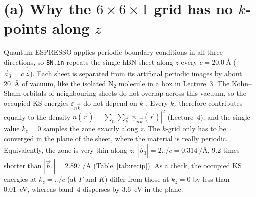 \documentclass[11pt,a4paper]{article}
\newcommand{\vb}[1]{\vec{#1}}
\begin{document}
\section*{(a) Why the $6\times6\times1$ grid has no $k$-points along $z$}
Quantum ESPRESSO applies periodic boundary conditions in all three directions, so \texttt{BN.in} repeats the
single hBN sheet along $z$ every $c=\SI{20.0}{\angstrom}$ ($\vb a_3=c\,\hat{\vb z}$). Each sheet is separated
from its artificial periodic images by about \SI{20}{\angstrom} of vacuum, like the isolated N$_2$ molecule in a box in
Lecture~3. The Kohn--Sham orbitals of neighbouring sheets do not overlap across this vacuum, so the occupied
KS energies $\varepsilon_{n\vb k}$ do not depend on $k_z$. Every $k_z$ therefore contributes equally to the density
$n(\vb r)=\sum_n\sum_{\vb k}|\psi_{n\vb k}(\vb r)|^2$ (Lecture~4), and the single value $k_z=0$ samples the
zone exactly along $z$. The $k$-grid only has to be converged in the plane of the sheet, where the material is
really periodic. Equivalently, the zone is very thin along $z$: $|\vb b_3|=2\pi/c=\SI{0.314}{\per\angstrom}$,
9.2 times shorter than $|\vb b_1|=\SI{2.897}{\per\angstrom}$ (Table~\ref{tab:recip}). As a check, the occupied
KS energies at $k_z=\pi/c$ (at $\Gamma$ and $K$) differ from those at $k_z=0$ by less than \SI{0.01}{eV}, whereas band~4
disperses by \SI{3.6}{eV} in the plane.
\end{document}
